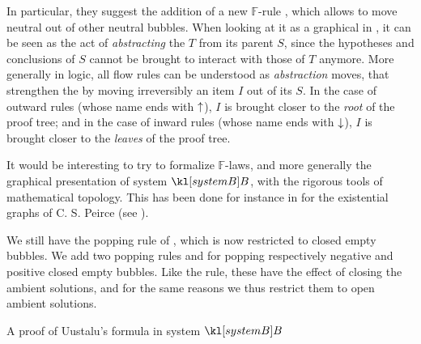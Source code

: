\begin{description}
  In particular, they suggest the addition of a new $\mathbb{F}$-rule
  , which allows to move neutral  out of other neutral
  bubbles. When looking at it as a graphical  in
  , it can be seen as the act of \emph{abstracting} the
   $T$ from its parent  $S$, since the hypotheses and conclusions
  of $S$ cannot be brought to interact with those of $T$ anymore. More generally
  in  logic, all flow rules can be understood as
  \emph{abstraction} moves, that strengthen the  by moving irreversibly an
  item $I$ out of its  $S$. In the case of outward rules (whose name ends
  with $\uparrow$), $I$ is brought closer to the \emph{root} of the proof tree;
  and in the case of inward rules (whose name ends with $\downarrow$), $I$ is
  brought closer to the \emph{leaves} of the proof tree.
  
  It would be interesting to try to formalize $\mathbb{F}$-laws, and more
  generally the graphical presentation of system $\sysB$, with the rigorous
  tools of mathematical topology. This has been done for instance in
   for the existential graphs of C. S.
  Peirce (see ).

  \item[\textbf{\membrane}] 
  We still have the popping rule  of , which is now restricted to
  closed empty bubbles. We add two popping rules  and  for
  popping respectively negative and positive closed empty bubbles. Like the
   rule, these have the effect of closing the ambient
  solutions, and for the same reasons we thus restrict them to open ambient
  solutions.

  \begin{marginfigure}
    
    \caption{A proof of Uustalu's formula in system $\sysB$}
  \end{marginfigure}


\end{description}
